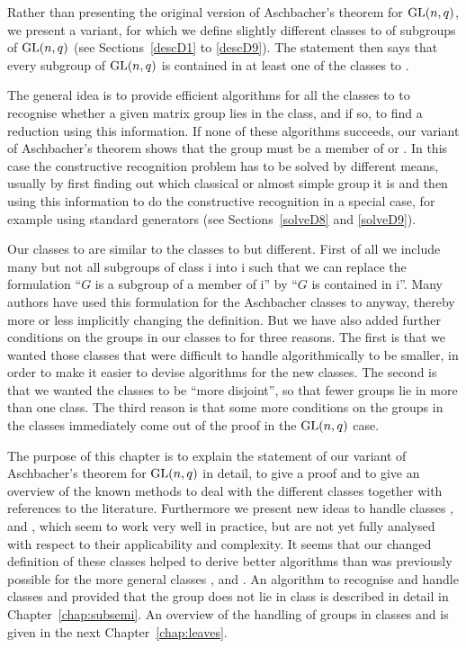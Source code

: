 Rather than presenting the original version of Aschbacher's theorem
for $\GL(n,q)$, we present a variant, for which we define slightly
different classes  to  of subgroups of $\GL(n,q)$ (see 
Sections~\ref{descD1} to \ref{descD9}). The statement
then says that every subgroup of $\GL(n,q)$ is contained in at least one
of the classes  to . 

The general idea is to provide efficient algorithms for all the classes  to
 to recognise whether a given matrix group lies in the class, and if
so, to find a reduction using this information. If none of these algorithms
succeeds, our variant of Aschbacher's theorem shows that the group must
be a member of  or . In this case the constructive recognition problem
has to be
solved by different means, usually by first finding out which classical
or almost simple group it is and then using this information to do the
constructive recognition in a special case, for example using standard
generators (see Sections~\ref{solveD8} and \ref{solveD9}).

Our classes  to  are similar to the classes  to  but
different. First of all we include many but not all subgroups of
class \CC i into \DD i such that we can replace the formulation ``$G$ is a
subgroup of a member of \CC i'' by ``$G$ is contained in \DD i''. Many
authors have used this formulation for the Aschbacher classes  to
 anyway, thereby more or less implicitly changing the definition. 
But we have also added further conditions on the groups
in our classes  to  for three reasons. The first is that we
wanted those classes that were difficult to handle algorithmically
to be smaller, in order to make it easier to devise algorithms for
the new classes. The second is that we wanted the classes to be
``more disjoint'', so that fewer groups lie in more than one
class. The third reason is that some more conditions on the groups in
the classes immediately come out of the proof in the $\GL(n,q)$ case.

The purpose of this chapter is to explain the statement of our variant 
of Aschbacher's 
theorem for $\GL(n,q)$ in detail, to give a proof and to give an
overview of the known methods to deal with the different classes
together with references to the literature. Furthermore we present new 
ideas to handle classes ,  and , which seem to work very
well in practice, but are not yet fully analysed with respect to their
applicability and complexity. It seems that our changed definition of
these classes helped to derive better algorithms than was previously
possible for the more general classes ,  and .
An algorithm to recognise
and handle classes  and  provided that the group does not lie in
class  is described in detail in Chapter~\ref{chap:subsemi}.
An overview of the handling of groups in classes  and  is
given in the next Chapter~\ref{chap:leaves}.

